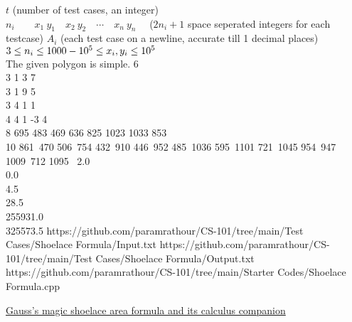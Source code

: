 \begin{testcasesMore}
	{$t$ \hfill(number of test cases, an integer)\\
	$n_i\qquad x_1\ y_1\quad x_2\ y_2\quad \cdots\quad  x_n\ y_n\quad$ \hfill($2n_i+1$ space seperated integers for each testcase)}
	{$A_{i}$ \hfill(each test case on a newline, accurate till 1 decimal places)}
	{$3 \leq n_i \leq 1000\\ -10^5 \leq x_i, y_i \leq 10^5$\\
	The given polygon is simple.}
	{6\\3 1 3 7\\3 1 9 5\\3 4 1 1\\4 4 1 -3 4\\8 695 483 469 636 825 1023 1033 853\quad\\10 861\ 470 506\ 754 432\ 910 446\ 952 485\ 1036  595\ 1101 721\ 1045 954\ 947 1009\ 712 1095\ }
	{2.0\\0.0\\4.5\\28.5\\255931.0\\325573.5}
	{https://github.com/paramrathour/CS-101/tree/main/Test Cases/Shoelace Formula/Input.txt}
	{https://github.com/paramrathour/CS-101/tree/main/Test Cases/Shoelace Formula/Output.txt}
	{https://github.com/paramrathour/CS-101/tree/main/Starter Codes/Shoelace Formula.cpp}
\end{testcasesMore}
\begin{funvideo}
\href{https://youtu.be/0KjG8Pg6LGk}{Gauss's magic shoelace area formula and its calculus companion}
\end{funvideo}
